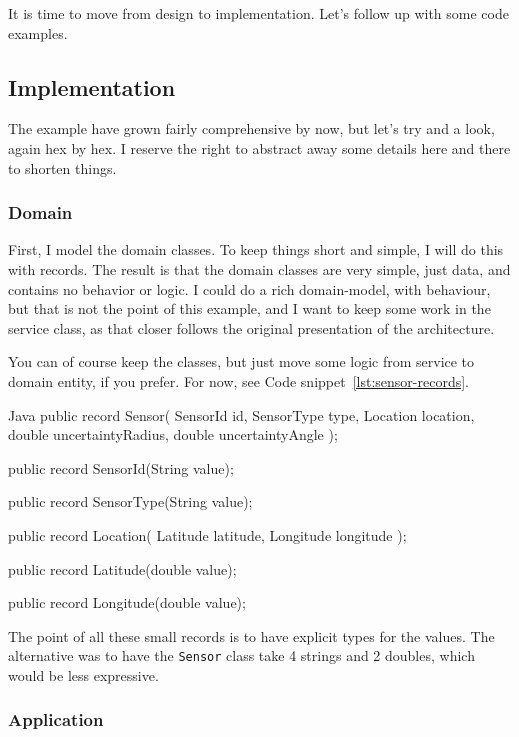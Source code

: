 It is time to move from design to implementation. Let's follow up with some code examples.

\subsection{Implementation}

The example have grown fairly comprehensive by now, but let's try and a look, again hex by hex. I reserve the right to abstract away some details here and there to shorten things.

\subsubsection{Domain}

First, I model the domain classes. To keep things short and simple, I will do this with records. The result is that the domain classes are very simple, just data, and contains no behavior or logic. I could do a rich domain-model, with behaviour, but that is not the point of this example, and I want to keep some work in the service class, as that closer follows the original presentation of the architecture.

You can of course keep the classes, but just move some logic from service to domain entity, if you prefer. For now, see Code snippet~\ref{lst:sensor-records}.

\begin{ridercode}{Java}
public record Sensor(
    SensorId id,
    SensorType type,
    Location location,
    double uncertaintyRadius,
    double uncertaintyAngle
);

public record SensorId(String value);

public record SensorType(String value);

public record Location(
    Latitude latitude,
    Longitude longitude
);

public record Latitude(double value);

public record Longitude(double value);
\end{ridercode}
\label{lst:sensor-records}

The point of all these small records is to have explicit types for the values. The alternative was to have the \texttt{Sensor} class take 4 strings and 2 doubles, which would be less expressive.

\subsubsection{Application}

